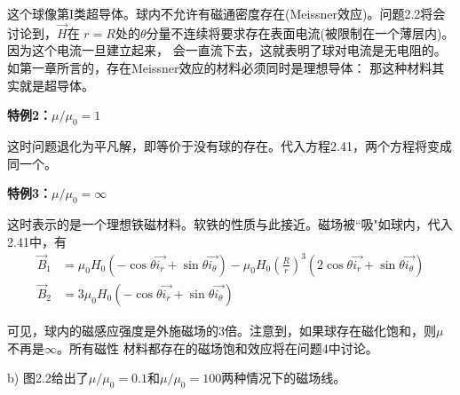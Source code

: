 这个球像第I类超导体。球内不允许有磁通密度存在(Meissner效应)。问题2.2将会讨论到，$\vec{H}$在
$r=R$处的$\theta$分量不连续将要求存在表面电流(被限制在一个薄层内)。因为这个电流一旦建立起来，
会一直流下去，这就表明了球对电流是无电阻的。如第一章所言的，存在Meissner效应的材料必须同时是理想导体：
那这种材料其实就是超导体。

\textbf{特例2：$\mu/\mu_0=1$}

这时问题退化为平凡解，即等价于没有球的存在。代入方程2.41，两个方程将变成同一个。

\textbf{特例3：$\mu/\mu_0=\infty$}

这时表示的是一个理想铁磁材料。软铁的性质与此接近。磁场被``吸"如球内，代入2.41中，有
	\begin{align}
\vec{B}_1&= \mu_0 H_0(−\cos\theta\vec{i_r} + \sin\theta\vec{i_\theta}) -
\mu_0 H_0\left(\frac{R}{r}\right)^3 (2 \cos\theta\vec{i_r} + \sin\theta\vec{i_\theta})\tag{S1.10a}\\
\vec{B}_2&=3\mu_0 H_0(−\cos\theta\vec{i_r} + \sin\theta\vec{i_\theta})\tag{S1.10b}
  	\end{align}


可见，球内的磁感应强度是外施磁场的3倍。注意到，如果球存在磁化饱和，则$\mu$不再是$\infty$。所有磁性
材料都存在的磁场饱和效应将在问题4中讨论。

b) 图2.2给出了$\mu/\mu_0=0.1$和$\mu/\mu_0=100$两种情况下的磁场线。

